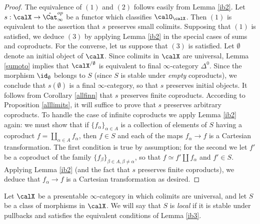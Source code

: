 \begin{proof}
The equivalence of $(1)$ and $(2)$ follows easily from Lemma \ref{ib2}.
Let $s: \calX \rightarrow \hat{\Cat}_{\infty}^{op}$ be a functor which classifies $\calO_{\calX}$.
Then $(1)$ is equivalent to the assertion that $s$ preserves small colimits. Supposing that $(1)$ is satisfied, we deduce $(3)$ by applying Lemma \ref{ib2} in the special cases of sums and coproducts. For the converse, let us suppose that $(3)$ is satisfied. Let $\emptyset$ denote an initial object of $\calX$. Since colimits in $\calX$ are universal, Lemma \ref{sumoto} implies that $\calX^{/\emptyset}$ is equivalent to final $\infty$-category $\Delta^0$.
Since the morphism $\id_{\emptyset}$ belongs to $S$ (since $S$ is stable under {\em empty} coproducts), we conclude that $s(\emptyset)$ is a final $\infty$-category, so that
$s$ preserves initial objects. It follows from Corollary \ref{allfinn} that $s$ preserves finite coproducts. According to Proposition \ref{alllimits}, it will suffice to prove that $s$ preserves arbitrary coproducts. To handle the case of infinite coproducts we apply Lemma \ref{ib2} again: we must show that if
$\{ f_{\alpha} \}_{\alpha \in A}$ is a collection of elements of $S$ having a coproduct
$f = \coprod_{\alpha \in A} f_{\alpha}$, then $f \in S$ and each of the maps $f_{\alpha} \rightarrow f$ is a Cartesian transformation. The first condition is true by assumption; for the second we 
let $f'$ be a coproduct of the family $\{ f_{\beta} \}_{\beta \in A, \beta \neq \alpha}$, so that $f \simeq f' \amalg f_{\alpha}$ and $f' \in S$. Applying Lemma \ref{ib2} (and the fact that $s$ preserves finite coproducts), we deduce that $f_{\alpha} \rightarrow f$ is a Cartesian transformation as desired.
\end{proof}

\begin{definition}\label{localitie}
Let $\calX$ be a presentable $\infty$-category in which colimits are universal, and let $S$ be a class of morphisms in $\calX$. We will say that $S$ is {\it local} if it is stable under pullbacks
and satisfies the equivalent conditions of Lemma \ref{ib3}.
\end{definition}

